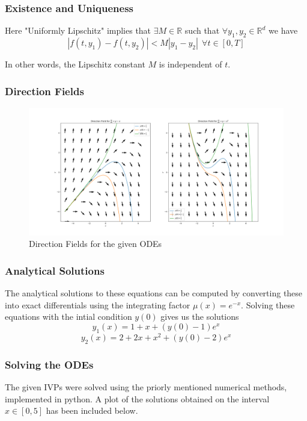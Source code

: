 \documentclass{beamer}
\begin{document}
\begin{frame}
    \frametitle{Existence and Uniqueness}

    Here "Uniformly Lipschitz" implies that $\exists M \in \mathbb{R}$ such that $\forall y_1, y_2 \in \mathbb{R}^d$ we have $$|f(t, y_1) - f(t, y_2)| < M|y_1 - y_2| ~ ~ \forall t \in [0, T]$$

    In other words, the Lipschitz constant $M$ is independent of $t$. 
    
    
\end{frame}
\begin{frame}
    \frametitle{Direction Fields}
    \begin{figure}[h]
        \centering
        \includegraphics[width=\linewidth]{"direction_fields.png"}
        \caption{Direction Fields for the given ODEs}
    \end{figure}
\end{frame}
\begin{frame}
    \frametitle{Analytical Solutions}
    The analytical solutions to these equations can be computed by converting these into exact differentials using the integrating factor $\mu(x) = e^{-x}$. Solving these equations with the intial condition $y(0)$ gives us the solutions
    $$\boxed{y_1(x) = 1 + x + (y(0) - 1)e^x}$$
    $$\boxed{y_2(x) = 2 + 2x + x^2 + (y(0) - 2)e^x}$$
\end{frame}

\begin{frame}
    \frametitle{Solving the ODEs}
    The given IVPs were solved using the priorly mentioned numerical methods, implemented in python.
    A plot of the solutions obtained on the interval $x \in [0, 5]$ has been included below.
\end{frame}
\end{document}
